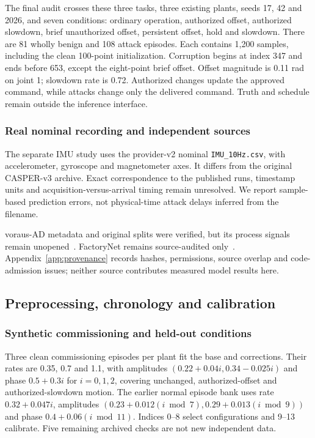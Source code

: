 The final audit crosses these three tasks, three existing plants, seeds 17, 42 and 2026, and seven conditions: ordinary operation, authorized offset, authorized slowdown, brief unauthorized offset, persistent offset, hold and slowdown. There are 81 wholly benign and 108 attack episodes. Each contains 1,200 samples, including the clean 100-point initialization. Corruption begins at index 347 and ends before 653, except the eight-point brief offset. Offset magnitude is 0.11 rad on joint 1; slowdown rate is 0.72. Authorized changes update the approved command, while attacks change only the delivered command. Truth and schedule remain outside the inference interface.

\subsubsection{Real nominal recording and independent sources}
The separate IMU study uses the provider-v2 nominal \texttt{IMU\_10Hz.csv}, with accelerometer, gyroscope and magnetometer axes. It differs from the original CASPER-v3 archive. Exact correspondence to the published runs, timestamp units and acquisition-versus-arrival timing remain unresolved. We report sample-based prediction errors, not physical-time attack delays inferred from the filename.

voraus-AD metadata and original splits were verified, but its process signals remain unopened~\cite{voraus}. FactoryNet remains source-audited only~\cite{factory}. Appendix~\ref{app:provenance} records hashes, permissions, source overlap and code-admission issues; neither source contributes measured model results here.

\subsection{Preprocessing, chronology and calibration}
\subsubsection{Synthetic commissioning and held-out conditions}
Three clean commissioning episodes per plant fit the base and corrections. Their rates are 0.35, 0.7 and 1.1, with amplitudes $(0.22+0.04i,0.34-0.025i)$ and phase $0.5+0.3i$ for $i=0,1,2$, covering unchanged, authorized-offset and authorized-slowdown motion. The earlier normal episode bank uses rate $0.32+0.047i$, amplitudes $(0.23+0.012(i\bmod7),0.29+0.013(i\bmod9))$ and phase $0.4+0.06(i\bmod11)$. Indices 0--8 select configurations and 9--13 calibrate. Five remaining archived checks are not new independent data.

